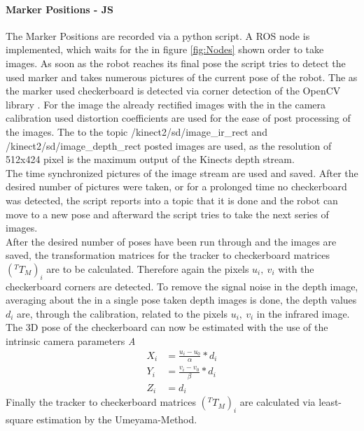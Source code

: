 \documentclass[conference]{IEEEtran}
\begin{document}
\paragraph{Marker Positions - JS}
\label{par:Marker Positions - JS}
The Marker Positions are recorded via a python script. A ROS node is implemented, which waits for the in figure \ref{fig:Nodes} shown order to take images. As soon as the robot reaches its final pose the script tries to detect the used marker and takes numerous pictures of the current pose of the robot. The as the marker used checkerboard is detected via corner detection of the OpenCV library \cite{opencv}. For the image the already rectified images with the in the camera calibration used distortion coefficients are used for the ease of post processing of the images. The to the topic /kinect2/sd/image\_ir\_rect and /kinect2/sd/image\_depth\_rect posted images are used, as the resolution of 512x424 pixel is the maximum output of the Kinects depth stream.\cite{kinectresol}\\ The time synchronized pictures of the image stream are used and saved.
After the desired number of pictures were taken, or for a prolonged time no checkerboard was detected, the script reports into a topic that it is done and the robot can move to a new pose and afterward the script tries to take the next series of images.\\
After the desired number of poses have been run through and the images are saved, the transformation matrices for the tracker to checkerboard matrices \((^TT_M)_i\) are to be calculated. Therefore again the pixels \textit{$u_i,\ v_i$} with the checkerboard corners are detected. To remove the signal noise in the depth image, averaging about the in a single pose taken depth images is done, the depth values \textit{$d_i$} are, through the calibration, related to the pixels \textit{$u_i,\ v_i$} in the infrared image. The 3D pose of the checkerboard can now be estimated with the use of the intrinsic camera parameters \textit{A}
\begin{align*}
X_i &= \frac{u_i-u_0}{\alpha}*d_i\\
Y_i &= \frac{v_i-v_0}{\beta}*d_i\\
Z_i &= d_i
\end{align*}
Finally the tracker to checkerboard matrices \((^TT_M)_i\) are calculated via least-square estimation by the Umeyama-Method.\cite{umeyama}
\end{document}
